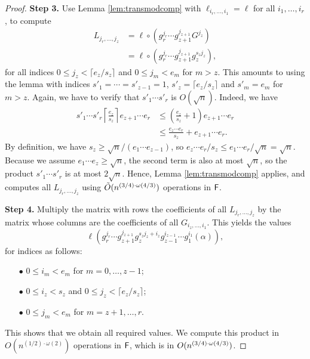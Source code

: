 \begin{proof}
\smallskip\noindent\textbf{Step 3.} Use Lemma \ref{lem:transmodcomp}
with $\ell_{i_r,\dots,i_1} = \ell$ for all $i_1,\dots,i_r$, to compute 
\begin{align*}
L_{j_r,\dots,j_z} &= \ell \circ (g_{r}^{j_{r}}\cdots g_{z+1}^{j_{z+1}}G^{j_z})\\ 
&= \ell \circ (g_{r}^{j_{r}}\cdots g_{z+1}^{j_{z+1}}g_{z}^{s_z j_z}),
\end{align*}
for all indices $0 \leq j_{z} < \lceil {e_{z}}/{s_z}\rceil$ and $0
\leq j_m < e_m$ for $m > z$. This amounts to using the lemma with
indices $s'_1=\cdots=s'_{z-1}=1$, $s'_z = \lceil {e_{z}}/{s_z}\rceil$
and $s'_m = e_m$ for $m > z$. Again, we have to verify that $s'_1
\cdots s'_r$ is $O(\sqrt n)$.  Indeed, we have
\begin{align*}
s'_1 \cdots s'_r   \left \lceil \frac{e_{z}}{s_z}\right \rceil e_{z+1} \cdots e_r
&\le \left (\frac{e_{z}}{s_z} +1 \right) e_{z+1} \cdots e_r\\
&\le \frac{e_{z} \cdots e_r}{s_z} + e_{z+1} \cdots e_r.
\end{align*}
By definition, we have $s_z \ge \sqrt{n}/(e_1\cdots e_{z-1})$, so
$e_z \cdots e_r/s_z \le e_1 \cdots e_r /\sqrt{n} =\sqrt{n}$.
Because we assume $e_1 \cdots e_{z} \geq \sqrt{n}$, the second term is
also at most $\sqrt{n}$, so the product $s'_1 \cdots s'_r$ is at most
$2 \sqrt{n}$. Hence, Lemma \ref{lem:transmodcomp} applies, and computes
all $L_{j_r,\dots,j_z}$ using $\tilde{O}(n^{(3/4)\cdot \omega(4/3)})$ operations
in ${\mathsf{F}}$.

\smallskip\noindent\textbf{Step 4.} Multiply the matrix with rows the
coefficients of all $L_{j_r,\dots,j_z}$ by the matrix whose columns
are the coefficients of all $G_{i_z,\dots,i_1}$. This yields the
values
$$\ell( 
g_{r}^{j_{r}}\cdots g_{z+1}^{j_{z+1}}g_{z}^{s_z j_z+i_z} g_{z-1}^{i_{z-1}}\cdots
g_1^{i_1}(\alpha)),$$
for indices as follows:
\begin{itemize}
\item[$\bullet$] $0 \le i_m < e_m$ for $m=0,\dots,z-1$;
\item[$\bullet$] $0 \le i_z < s_z$ and $0 \le j_z< \lceil  e_z/s_z\rceil$;
\item[$\bullet$] $0 \le j_m < e_m$ for $m=z+1,\dots,r$.
\end{itemize}
This shows that we obtain all required values. We compute this product
in $O(n^{(1/2)\cdot\omega(2)})$ operations in ${\mathsf{F}}$, which is in
$O(n^{(3/4)\cdot \omega(4/3)})$.
\end{proof}


